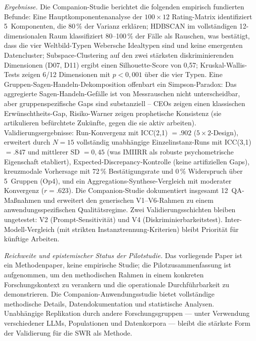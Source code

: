 \documentclass[11pt,a4paper]{article}
\theoremstyle{definition}
\theoremstyle{plain}
\theoremstyle{remark}
\begin{document}
\emph{Ergebnisse.} Die Companion-Studie \citep{Geiger2026Elite} berichtet die folgenden empirisch fundierten Befunde: Eine Hauptkomponentenanalyse der $100 \times 12$ Rating-Matrix identifiziert 5~Komponenten, die 80\,\% der Varianz erkl\"aren; HDBSCAN im vollst\"andigen 12-dimensionalen Raum klassifiziert 80--100\,\% der F\"alle als Rauschen, was best\"atigt, dass die vier Weltbild-Typen Webersche Idealtypen sind und keine emergenten Datencluster; Subspace-Clustering auf den zwei st\"arksten diskriminierenden Dimensionen (D07, D11) ergibt einen Silhouette-Score von 0{,}57; Kruskal-Wallis-Tests zeigen 6/12 Dimensionen mit $p < 0{,}001$ \"uber die vier Typen. Eine Gruppen-Sagen-Handeln-Dekomposition offenbart ein Simpson-Paradox: Das aggregierte Sagen-Handeln-Gef\"alle ist von Messrauschen nicht unterscheidbar, aber gruppenspezifische Gaps sind substanziell -- CEOs zeigen einen klassischen Erw\"unschtheits-Gap, Risiko-Warner zeigen prophetische Konsistenz (sie artikulieren bef\"urchtete Zuk\"unfte, gegen die sie aktiv arbeiten). Validierungsergebnisse: Run-Konvergenz mit ICC(2,1) $= .902$ ($5 \times 2$-Design), erweitert durch $N = 15$ vollst\"andig unabh\"angige Einzelinstanz-Runs mit ICC(3,1) $= .847$ und mittlerer SD $= 0{,}45$ (was IMIIRR als robuste psychometrische Eigenschaft etabliert), Expected-Discrepancy-Kontrolle (keine artifiziellen Gaps), kreuzmodale Vorhersage mit 72\,\% Best\"atigungsrate und 0\,\% Widerspruch \"uber 5~Gruppen (Op4), und ein Aggregations-Synthese-Vergleich mit moderater Konvergenz ($r = .623$). Die Companion-Studie dokumentiert insgesamt 12~QA-Ma\ss{}nahmen und erweitert den generischen V1--V6-Rahmen zu einem anwendungsspezifischen Qualit\"atsregime. Zwei Validierungsschichten bleiben ungetestet: V2 (Prompt-Sensitivit\"at) und V4 (Diskriminierbarkeitstest). Inter-Modell-Vergleich (mit strikten Instanztrennung-Kriterien) bleibt Priorit\"at f\"ur k\"unftige Arbeiten.

\emph{Reichweite und epistemischer Status der Pilotstudie.} Das vorliegende Paper ist ein Methodenpaper, keine empirische Studie; die Pilotzusammenfassung ist aufgenommen, um den methodischen Rahmen in einem konkreten Forschungskontext zu verankern und die operationale Durchf\"uhrbarkeit zu demonstrieren. Die Companion-Anwendungsstudie \citep{Geiger2026Elite} bietet vollst\"andige methodische Details, Datendokumentation und statistische Analysen. Unabh\"angige Replikation durch andere Forschungsgruppen --- unter Verwendung verschiedener LLMs, Populationen und Datenkorpora --- bleibt die st\"arkste Form der Validierung f\"ur die SWR als Methode.
\end{document}
